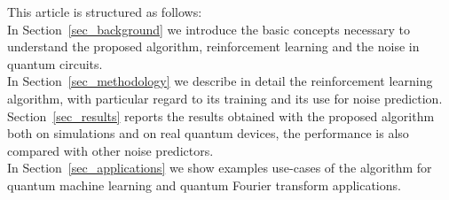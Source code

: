 \documentclass[referee,sn-basic]{sn-jnl} %
\begin{document}
\noindent
This article is structured as follows:\\
In Section~\ref{sec_background} we introduce the basic concepts necessary to understand the proposed algorithm, reinforcement learning and the noise in quantum circuits. \\
In Section~\ref{sec_methodology} we describe in detail the reinforcement learning algorithm, with particular regard to its training and its use for noise prediction. \\
Section~\ref{sec_results} reports the results obtained with the proposed algorithm both on simulations and on real quantum devices, the performance is also compared with other noise predictors. \\
In Section~\ref{sec_applications} we show examples use-cases of the algorithm for quantum machine learning and quantum Fourier transform applications.


\end{document}
